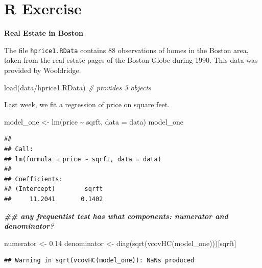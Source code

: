 \documentclass[
]{book}
\newenvironment{Shaded}{\begin{snugshade}}{\end{snugshade}}
\newcommand{\AttributeTok}[1]{\textcolor[rgb]{0.77,0.63,0.00}{#1}}
\newcommand{\CommentTok}[1]{\textcolor[rgb]{0.56,0.35,0.01}{\textit{#1}}}
\newcommand{\DocumentationTok}[1]{\textcolor[rgb]{0.56,0.35,0.01}{\textbf{\textit{#1}}}}
\newcommand{\FloatTok}[1]{\textcolor[rgb]{0.00,0.00,0.81}{#1}}
\newcommand{\FunctionTok}[1]{\textcolor[rgb]{0.00,0.00,0.00}{#1}}
\newcommand{\NormalTok}[1]{#1}
\newcommand{\OtherTok}[1]{\textcolor[rgb]{0.56,0.35,0.01}{#1}}
\newcommand{\SpecialCharTok}[1]{\textcolor[rgb]{0.00,0.00,0.00}{#1}}
\newcommand{\StringTok}[1]{\textcolor[rgb]{0.31,0.60,0.02}{#1}}
\theoremstyle{definition}
\theoremstyle{definition}
\theoremstyle{definition}
\theoremstyle{definition}
\theoremstyle{remark}
\begin{document}
\hypertarget{r-exercise-1}{%
\section{R Exercise}\label{r-exercise-1}}

\textbf{Real Estate in Boston}

The file \texttt{hprice1.RData} contains 88 observations of homes in the Boston area, taken from the real estate pages of the Boston Globe during 1990. This data was provided by Wooldridge.

\begin{Shaded}
\begin{Highlighting}[]
\FunctionTok{load}\NormalTok{(}\StringTok{\textquotesingle{}data/hprice1.RData\textquotesingle{}}\NormalTok{) }\CommentTok{\# provides 3 objects }
\end{Highlighting}
\end{Shaded}

Last week, we fit a regression of price on square feet.

\begin{Shaded}
\begin{Highlighting}[]
\NormalTok{model\_one }\OtherTok{\textless{}{-}} \FunctionTok{lm}\NormalTok{(price }\SpecialCharTok{\textasciitilde{}}\NormalTok{ sqrft, }\AttributeTok{data =}\NormalTok{ data)}
\NormalTok{model\_one}
\end{Highlighting}
\end{Shaded}

\begin{verbatim}
## 
## Call:
## lm(formula = price ~ sqrft, data = data)
## 
## Coefficients:
## (Intercept)        sqrft  
##     11.2041       0.1402
\end{verbatim}

\begin{Shaded}
\begin{Highlighting}[]
\DocumentationTok{\#\# any frequentist test has what components: numerator and denominator? }

\NormalTok{numerator   }\OtherTok{\textless{}{-}} \FloatTok{0.14}
\NormalTok{denominator }\OtherTok{\textless{}{-}} \FunctionTok{diag}\NormalTok{(}\FunctionTok{sqrt}\NormalTok{(}\FunctionTok{vcovHC}\NormalTok{(model\_one)))[}\StringTok{\textquotesingle{}sqrft\textquotesingle{}}\NormalTok{]}
\end{Highlighting}
\end{Shaded}

\begin{verbatim}
## Warning in sqrt(vcovHC(model_one)): NaNs produced
\end{verbatim}
\end{document}
